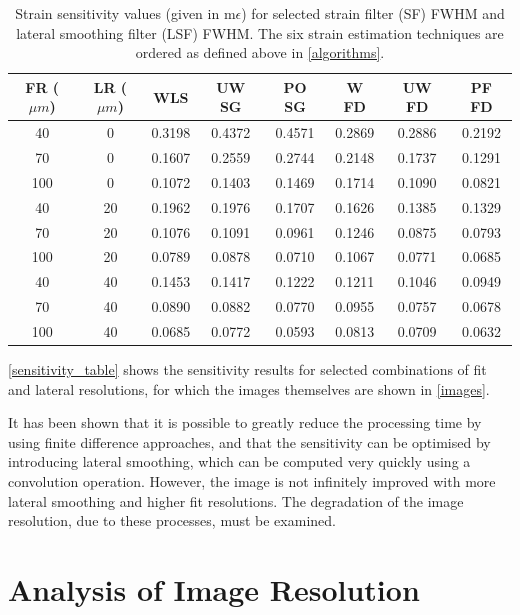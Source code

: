 \begin{table}[h]
	\begin{center}
		\begin{tabular}{|c||c||c|c|c|c|c|c|}
			\hline 
			FR ($\mu m$) & LR ($\mu m$) & WLS & UW SG & PO SG & W FD & UW FD & PF FD \\
			\hline
			\hline
			40 & 0 & 0.3198 & 0.4372 & 0.4571 & 0.2869 & 0.2886 & 0.2192 \\
			\hline
			70 & 0 & 0.1607 & 0.2559 & 0.2744 & 0.2148 & 0.1737 & 0.1291 \\
			\hline
			100 & 0 & 0.1072 & 0.1403 & 0.1469 & 0.1714 & 0.1090 & 0.0821 \\
			\hline
			40 & 20 & 0.1962 & 0.1976 & 0.1707 & 0.1626 & 0.1385 & 0.1329 \\
			\hline
			70 & 20 & 0.1076 & 0.1091 & 0.0961 & 0.1246 & 0.0875 & 0.0793 \\
			\hline
			100 & 20 & 0.0789 & 0.0878 & 0.0710 & 0.1067 & 0.0771 & 0.0685 \\
			\hline
			40 & 40 & 0.1453 & 0.1417 & 0.1222 & 0.1211 & 0.1046 & 0.0949 \\
			\hline
			70 & 40 & 0.0890 & 0.0882 & 0.0770 & 0.0955 & 0.0757 & 0.0678 \\
			\hline
			100 & 40 & 0.0685 & 0.0772 & 0.0593 & 0.0813 & 0.0709 & 0.0632 \\
			\hline
		\end{tabular}
	\end{center}
	\caption{Strain sensitivity values (given in m$\epsilon$) for selected strain filter (SF) FWHM and lateral smoothing filter (LSF) FWHM. The six strain estimation techniques are ordered as defined above in \autoref{algorithms}.}
	\label{sensitivity_table}
\end{table}

\autoref{sensitivity_table} shows the sensitivity results for selected combinations of fit and lateral resolutions, for which the images themselves are shown in \autoref{images}.

It has been shown that it is possible to greatly reduce the processing time by using finite difference approaches, and that the sensitivity can be optimised by introducing lateral smoothing, which can be computed very quickly using a convolution operation. However, the image is not infinitely improved with more lateral smoothing and higher fit resolutions. The degradation of the image resolution, due to these processes, must be examined. 

\section{Analysis of Image Resolution} \label{image_res_results}


